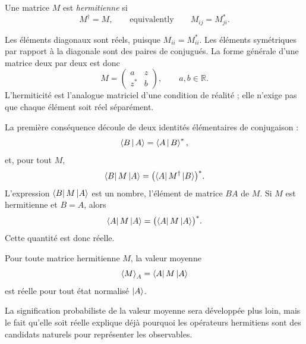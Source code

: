 \begin{definition}
Une matrice \(M\) est \emph{hermitienne} si
\begin{equation}
  M^\dagger=M,
  \qquad\text{equivalently}\qquad
  M_{ij}=M_{ji}^*.
  \label{eq:l03-hermitian}
\end{equation}
\end{definition}

Les éléments diagonaux sont réels, puisque \(M_{ii}=M_{ii}^*\). Les éléments symétriques par rapport à la diagonale sont des paires de conjugués. La forme générale d’une matrice deux par deux est donc
\begin{equation}
  M=
  \begin{pmatrix}
    a&z\\
    z^*&b
  \end{pmatrix},
  \qquad a,b\in\mathbb R.
  \label{eq:l03-hermitian-two}
\end{equation}
L’hermiticité est l’analogue matriciel d’une condition de réalité ; elle n’exige pas que chaque élément soit réel séparément.

La première conséquence découle de deux identités élémentaires de conjugaison :
\begin{equation}
  \left\langle B\,\middle|\,A\right\rangle=\left\langle A\,\middle|\,B\right\rangle^*,
  \label{eq:l03-inner-conjugation}
\end{equation}
et, pour tout \(M\),
\begin{equation}
  \left\langle B\right\rvert M\left\lvert A\right\rangle
  =
  \bigl(\left\langle A\right\rvert M^\dagger\left\lvert B\right\rangle\bigr)^*.
  \label{eq:l03-matrix-element-conjugation}
\end{equation}
L’expression \(\left\langle B\right\rvert M\left\lvert A\right\rangle\) est un nombre, l’élément de matrice \(BA\) de \(M\). Si \(M\) est hermitienne et \(B=A\), alors
\begin{equation}
  \left\langle A\right\rvert M\left\lvert A\right\rangle
  =
  \bigl(\left\langle A\right\rvert M\left\lvert A\right\rangle\bigr)^*.
\end{equation}
Cette quantité est donc réelle.

\begin{proposition}
Pour toute matrice hermitienne \(M\), la valeur moyenne
\begin{equation}
  \left\langle M\right\rangle_A=\left\langle A\right\rvert M\left\lvert A\right\rangle
  \label{eq:l03-expectation}
\end{equation}
est réelle pour tout état normalisé \(\left\lvert A\right\rangle\).
\end{proposition}

La signification probabiliste de la valeur moyenne sera développée plus loin, mais le fait qu’elle soit réelle explique déjà pourquoi les opérateurs hermitiens sont des candidats naturels pour représenter les observables.

